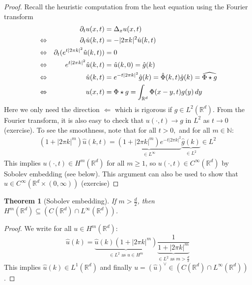 \documentclass{report}
\theoremstyle{tommy}
\newtheorem{thm}[defn]{Theorem}
\begin{document}
\begin{proof}
  Recall the heuristic computation from the heat equation using the Fourier transform 
  \begin{align*}
    &&\partial_t u(x,t) &= \Delta_x u(x,t) \\
    &\Leftrightarrow&\partial_t \hat u (k,t) &= -|2\pi k|^2 \hat u (k,t) \\
    &\Leftrightarrow&\partial_t(e^{t|2\pi k|^2} \hat u(k,t)) &= 0 \\
    &\Leftrightarrow&e^{t|2\pi k|^2} \hat u(k,t) &= \hat u(k,0) = \hat g (k) \\
    &\Leftrightarrow& \hat u(k,t) &= e^{-t|2 \pi k|^2} \hat g(k) = \hat \Phi(k,t) \hat g(k) = \widehat{\Phi \star g} \qedhere \\
    &\Leftrightarrow& u(x,t) &= \Phi \star g = \int_{\mathbb{R}^d} \Phi(x-y,t) g(y) \, dy
  \end{align*}
  Here we only need the direction \(\Leftarrow\) which is rigorous if \(g \in L^2(\mathbb{R}^d)\). From the Fourier transform, it is also easy to check that \(u(\cdot, t) \to g\) in \(L^2\) as \(t \to 0\) (exercise). To see the smoothness, note that for all \(t>0,\) and for all \(m \in \mathbb{N}\):
  \begin{align*}
    (1 + |2 \pi k|^m) \hat u(k,t) = \underbrace{(1+|2 \pi k|^m) e^{-t|2 \pi k|^2}}_{\in L^\infty} \underbrace{\hat g(k)}_{\in L^2} \in L^2
  \end{align*}
  This implies \(u(\cdot, t) \in H^m(\mathbb{R}^d)\) for all \(m \ge 1\), so \(u(\cdot, t) \in C^\infty(\mathbb{R}^d)\) by Sobolev embedding (see below). This argument can also be used to show that \(u \in C^\infty(\mathbb{R}^d \times (0,\infty))\) (exercise)
\end{proof}


\begin{thm}[Sobolev embedding] 
  If \(m > \frac{d}{2}\), then \(H^m(\mathbb{R}^d) \subseteq (C(\mathbb{R}^d) \cap L^\infty(\mathbb{R}^d))\).
\end{thm}

\begin{proof}
  We write for all \(u \in H^m(\mathbb{R}^d)\):
  \[\hat u(k) = \underbrace{\hat u(k) (1 + |2\pi k|^m)}_{\in L^2 \text{ as } u \in H^m} \underbrace{\frac{1}{1 + |2 \pi k|^m}}_{\in L^2 \text{ as } m > \frac{d}{2}}\]
  This implies \(\hat u(k) \in L^1(\mathbb{R}^d)\) and finally \(u = (\hat u)^\lor \in (C(\mathbb{R}^d) \cap L^\infty(\mathbb{R}^d))\).
\end{proof}
\end{document}
